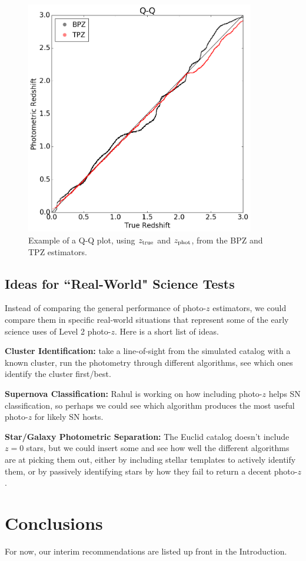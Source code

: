 \documentclass[DM,lsstdraft,toc]{lsstdoc}
\begin{document}
\begin{figure}
\begin{center}
\includegraphics[width=10cm]{figures/qq_BPZ_TPZ.png}
\caption{Example of a Q-Q plot, using $z_{\rm true}$ and $z_{\rm phot}$, from the BPZ and TPZ estimators.}\label{fig:qq}
\end{center}
\end{figure}


\subsection{Ideas for ``Real-World" Science Tests}\label{ssec:more}

Instead of comparing the general performance of photo-$z$ estimators, we could compare them in specific real-world situations that represent some of the early science uses of Level 2 photo-$z$. Here is a short list of ideas.

\textbf{Cluster Identification:} take a line-of-sight from the simulated catalog with a known cluster, run the photometry through different algorithms, see which ones identify the cluster first/best.

\textbf{Supernova Classification:} Rahul is working on how including photo-$z$ helps SN classification, so perhaps we could see which algorithm produces the most useful photo-$z$ for likely SN hosts.

\textbf{Star/Galaxy Photometric Separation:} The Euclid catalog doesn't include $z=0$ stars, but we could insert some and see how well the different algorithms are at picking them out, either by including stellar templates to actively identify them, or by passively identifying stars by how they fail to return a decent photo-$z$.

\section{Conclusions}

For now, our interim recommendations are listed up front in the Introduction.


\end{document}
